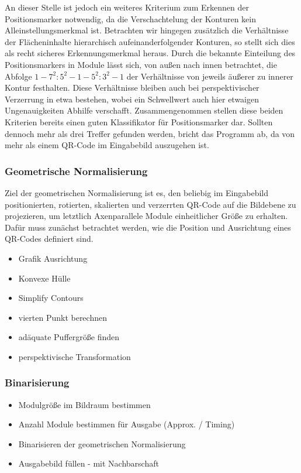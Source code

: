 \documentclass[a4paper, oneside, 12pt]{article}
\begin{document}
An dieser Stelle ist jedoch ein weiteres Kriterium zum Erkennen der Positionsmarker notwendig, da die Verschachtelung der Konturen kein Alleinstellungsmerkmal ist.
Betrachten wir hingegen zusätzlich die Verhältnisse der Flächeninhalte hierarchisch aufeinanderfolgender Konturen, so stellt sich dies als recht sicheres Erkennungsmerkmal heraus. Durch die bekannte Einteilung des Positionsmarkers in Module lässt sich, von außen nach innen betrachtet, die Abfolge $1 - 7^2:5^2 - 1 - 5^2:3^2 - 1$ der Verhältnisse von jeweils äußerer zu innerer Kontur festhalten.
Diese Verhältnisse bleiben auch bei perspektivischer Verzerrung in etwa bestehen, wobei ein Schwellwert auch hier etwaigen Ungenauigkeiten Abhilfe verschafft.
Zusammengenommen stellen diese beiden Kriterien bereits einen guten Klassifikator für Positionsmarker dar. Sollten dennoch mehr als drei Treffer gefunden werden, bricht das Programm ab, da von mehr als einem QR-Code im Eingabebild auszugehen ist.

\subsubsection{Geometrische Normalisierung}

Ziel der geometrischen Normalisierung ist es, den beliebig im Eingabebild positionierten, rotierten, skalierten und verzerrten QR-Code auf die Bildebene zu projezieren, um letztlich Axenparallele Module einheitlicher Größe zu erhalten.
Dafür muss zunächst betrachtet werden, wie die Position und Ausrichtung eines QR-Codes definiert sind.

\begin{itemize}
	\item Grafik Ausrichtung
	\item Konvexe Hülle
	\item Simplify Contours
	\item vierten Punkt berechnen
	\item adäquate Puffergröße finden
	\item perspektivische Transformation
\end{itemize}

\subsubsection{Binarisierung}

\begin{itemize}
	\item Modulgröße im Bildraum bestimmen
	\item Anzahl Module bestimmen für Ausgabe (Approx. / Timing)
	\item Binarisieren der geometrischen Normalisierung
	\item Ausgabebild füllen - mit Nachbarschaft
\end{itemize}
\end{document}
